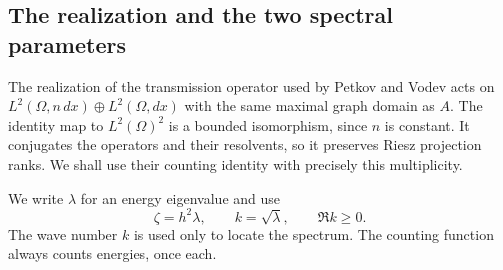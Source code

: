 \documentclass[11pt,a4paper]{article}
\theoremstyle{remark}
\numberwithin{equation}{section}
\begin{document}
\subsection{The realization and the two spectral parameters}
The realization of the transmission operator used by Petkov and Vodev
\cite[Section~3]{PV} acts on
$L^2(\Omega,n\,dx)\oplus L^2(\Omega,dx)$ with the same maximal graph
domain as $A$. The identity map to $L^2(\Omega)^2$ is a bounded
isomorphism, since $n$ is constant. It conjugates the operators and their
resolvents, so it preserves Riesz projection ranks. We shall use their
counting identity with precisely this multiplicity.

We write $\lambda$ for an energy eigenvalue and use
\begin{equation}\label{eq:scales}
 \zeta=h^2\lambda,\qquad k=\sqrt\lambda,\qquad \Re k\ge0.
\end{equation}
The wave number $k$ is used only to locate the spectrum. The counting
function always counts energies, once each.
\end{document}
